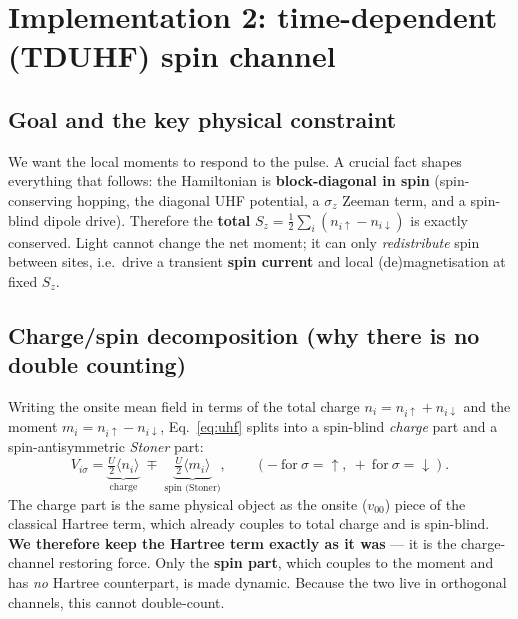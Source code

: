\documentclass[11pt]{article}
\begin{document}
\section{Implementation 2: time-dependent (TDUHF) spin channel}
\label{sec:tduhf}

\subsection{Goal and the key physical constraint}
We want the local moments to respond to the pulse. A crucial fact shapes
everything that follows: the Hamiltonian is \textbf{block-diagonal in spin}
(spin-conserving hopping, the diagonal UHF potential, a $\sigma_z$ Zeeman term,
and a spin-blind dipole drive). Therefore the \textbf{total}
$S_z=\tfrac12\sum_i(n_{i\uparrow}-n_{i\downarrow})$ is exactly conserved. Light
cannot change the net moment; it can only \emph{redistribute} spin between
sites, i.e.\ drive a transient \textbf{spin current} and local
(de)magnetisation at fixed $S_z$.

\subsection{Charge/spin decomposition (why there is no double counting)}
Writing the onsite mean field in terms of the total charge
$n_i=n_{i\uparrow}+n_{i\downarrow}$ and the moment
$m_i=n_{i\uparrow}-n_{i\downarrow}$, Eq.~\eqref{eq:uhf} splits into a
spin-blind \emph{charge} part and a spin-antisymmetric \emph{Stoner} part:
\begin{equation}
V_{i\sigma}=\underbrace{\tfrac{U}{2}\langle n_i\rangle}_{\text{charge}}
\;\mp\;\underbrace{\tfrac{U}{2}\langle m_i\rangle}_{\text{spin (Stoner)}},
\qquad (-\ \text{for}\ \sigma=\uparrow,\ +\ \text{for}\ \sigma=\downarrow).
\end{equation}
The charge part is the same physical object as the onsite ($v_{00}$) piece of
the classical Hartree term, which already couples to total charge and is
spin-blind. \textbf{We therefore keep the Hartree term exactly as it was} --- it
is the charge-channel restoring force. Only the \textbf{spin part}, which
couples to the moment and has \emph{no} Hartree counterpart, is made dynamic.
Because the two live in orthogonal channels, this cannot double-count.
\end{document}
